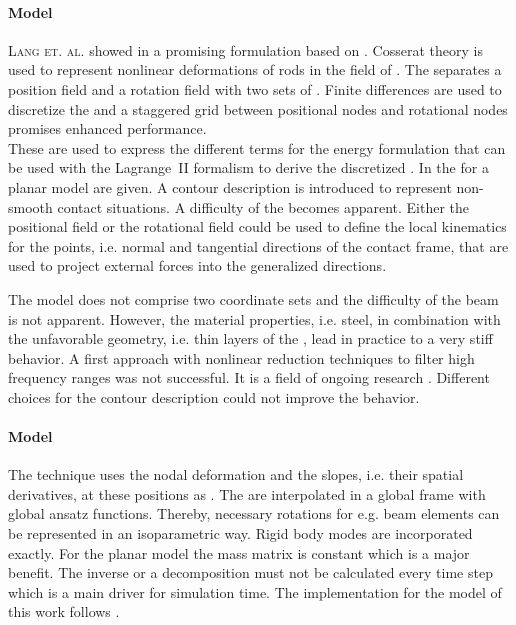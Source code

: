 \paragraph{\LRVM Model}
\textsc{Lang et. al.} showed in \cite{lang_multi-body_2011} a promising formulation based on \LRVM.
Cosserat theory is used to represent nonlinear deformations of rods in the field of \MBS.
The \LRVM separates a position field and a rotation field with two sets of \DOFs.
Finite differences are used to discretize the \EOM and a staggered grid between positional nodes and rotational nodes promises enhanced performance.\\
These are used to express the different terms for the energy formulation that can be used with the Lagrange~II formalism to derive the discretized \EOM.
In \cite{cebulla_spatial_2014} the \EOMs for a planar model are given.
A contour description is introduced to represent non-smooth contact situations.
A difficulty of the \LRVM becomes apparent.
Either the positional field or the rotational field could be used to define the local kinematics for the points, i.e. normal and tangential directions of the contact frame, that are used to project external forces into the generalized directions.\par

The model does not comprise two coordinate sets and the difficulty of the \RCM beam is not apparent.
However, the material properties, i.e. steel, in combination with the unfavorable geometry, i.e. thin layers of the \rings, lead in practice to a very stiff behavior.
A first approach with nonlinear reduction techniques to filter high frequency ranges was not successful.
It is a field of ongoing research \cite{cebulla_application_2015}.
Different choices for the contour description could not improve the behavior.

\paragraph{\ANCF Model}
The \ANCF technique uses the nodal deformation and the slopes, i.e. their spatial derivatives, at these positions as \DOFs.
The \DOFs are interpolated in a global frame with global ansatz functions.
Thereby, necessary rotations for e.g. beam elements can be represented in an isoparametric way.
Rigid body modes are incorporated exactly.
For the planar model the mass matrix is constant which is a major benefit.
The inverse or a decomposition must not be calculated every time step which is a main driver for simulation time.
The implementation for the model of this work follows \cite[chap. 7]{shabana_dynamics_2005}.\par

